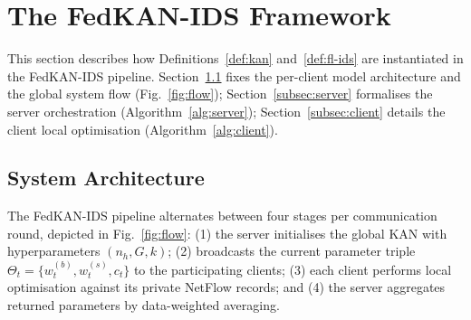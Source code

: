 \section{The FedKAN-IDS Framework}\label{sec:method}

This section describes how Definitions~\ref{def:kan} and~\ref{def:fl-ids} are instantiated in the FedKAN-IDS pipeline. Section~\ref{subsec:arch} fixes the per-client model architecture and the global system flow (Fig.~\ref{fig:flow}); Section~\ref{subsec:server} formalises the server orchestration (Algorithm~\ref{alg:server}); Section~\ref{subsec:client} details the client local optimisation (Algorithm~\ref{alg:client}).

\subsection{System Architecture}\label{subsec:arch}

The FedKAN-IDS pipeline alternates between four stages per communication round, depicted in Fig.~\ref{fig:flow}: (1) the server initialises the global KAN with hyperparameters $(n_h, G, k)$; (2) broadcasts the current parameter triple $\Theta_t = \{w^{(b)}_t, w^{(s)}_t, c_t\}$ to the participating clients; (3) each client performs local optimisation against its private NetFlow records; and (4) the server aggregates returned parameters by data-weighted averaging.

